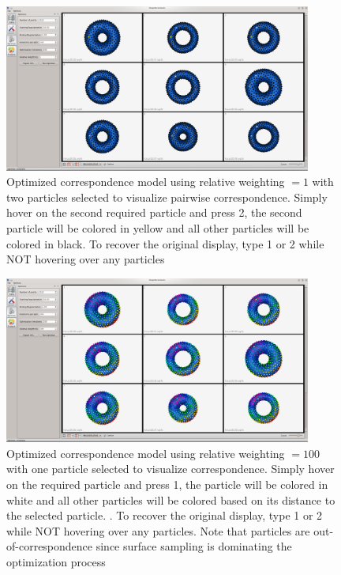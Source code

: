 \documentclass[letterpaper,12pt]{article}   %
\begin{document}
\begin{figure}[!htp]
\centering
\includegraphics[width=0.9\textwidth]{figs/rel1_hover2.png}
\caption{Optimized correspondence model using relative weighting $ = 1$ with two particles selected to visualize pairwise correspondence. Simply hover on the second required particle and press 2, the second particle will be colored in yellow and all other particles will be colored in black. To recover the original display, type 1 or 2 while NOT hovering over any particles}
\label{fig:rel1_hover2}
\end{figure}


\begin{figure}[!htp]
\centering
\includegraphics[width=0.9\textwidth]{figs/rel100_hover1.png}
\caption{Optimized correspondence model using relative weighting $ = 100$ with one particle selected to visualize correspondence. Simply hover on the required particle and press 1, the particle will be colored in white and all other particles will be colored based on its distance to the selected particle. . To recover the original display, type 1 or 2 while NOT hovering over any particles. Note that particles are out-of-correspondence since surface sampling is dominating the optimization process}
\label{fig:rel100_hover1}
\end{figure}
\end{document}
